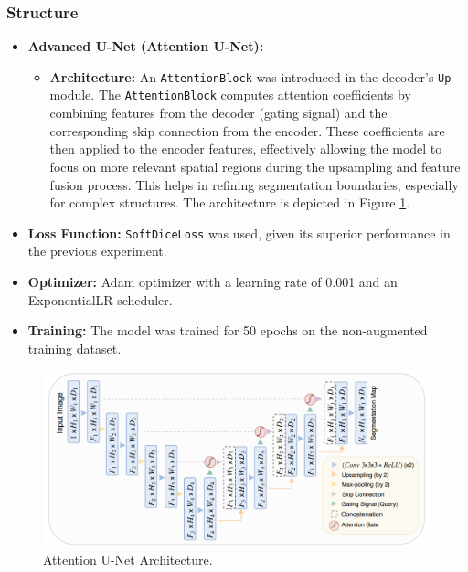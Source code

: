 \documentclass{article}
\begin{document}
\subsubsection{Structure}
\begin{itemize}
  \item \textbf{Advanced U-Net (Attention U-Net):}
        \begin{itemize}
          \item \textbf{Architecture:} An \texttt{AttentionBlock} was introduced in the decoder's \texttt{Up} module. The \texttt{AttentionBlock} computes attention coefficients by combining features from the decoder (gating signal) and the corresponding skip connection from the encoder. These coefficients are then applied to the encoder features, effectively allowing the model to focus on more relevant spatial regions during the upsampling and feature fusion process. This helps in refining segmentation boundaries, especially for complex structures. The architecture is depicted in Figure \ref{fig:attention_unet_architecture}.
        \end{itemize}
  \item \textbf{Loss Function:} \texttt{SoftDiceLoss} was used, given its superior performance in the previous experiment.
  \item \textbf{Optimizer:} Adam optimizer with a learning rate of 0.001 and an ExponentialLR scheduler.
  \item \textbf{Training:} The model was trained for 50 epochs on the non-augmented training dataset.
\end{itemize}

\begin{figure}[H]
  \centering
  \includegraphics[width=\linewidth]{../result/for_ppt/attention_unet.png}
  \caption{Attention U-Net Architecture.}
  \label{fig:attention_unet_architecture}
\end{figure}
\end{document}
